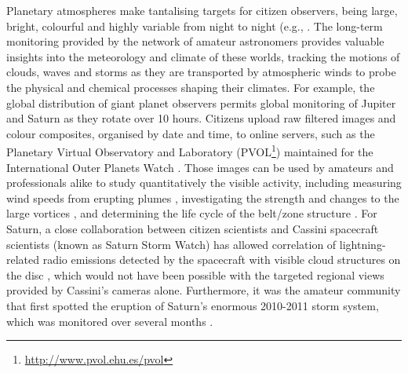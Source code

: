 \documentclass{ar2e}
\begin{document}

Planetary atmospheres make tantalising targets for citizen observers, being
large, bright, colourful and highly variable from night to night (e.g., 
.  The long-term monitoring provided by the network of amateur
astronomers provides valuable insights into the meteorology and climate of these
worlds, tracking the motions of clouds, waves and storms as they are transported
by atmospheric winds to probe the physical and chemical processes shaping their
climates.  For example, the global distribution of giant planet observers
permits global monitoring of Jupiter and Saturn as they rotate over 10 hours.
Citizens upload raw filtered images and colour composites, organised by date and
time, to online servers, such as the Planetary Virtual Observatory and
Laboratory (PVOL\footnote{\url{http://www.pvol.ehu.es/pvol}}) maintained for the
International Outer Planets Watch \citep[IOPW][]{10hueso}.  Those images can be
used by amateurs and professionals alike to study quantitatively the visible
activity, including  measuring wind speeds from erupting plumes
\citep{08sanchez}, investigating the strength and changes to the large vortices
\citep[e.g., the 2006 reddening of Jupiter's Oval BA,][]{06simon-miller}, and
determining the life cycle of the belt/zone structure \citep{96sanchez,
11fletcher_fade}.  For Saturn, a close collaboration between citizen scientists
and Cassini spacecraft scientists (known as Saturn Storm Watch) has allowed
correlation of lightning-related radio emissions detected by the spacecraft with
visible cloud structures on the disc \citep[e.g.,][]{11fischer}, which would not
have been possible with the targeted regional views provided by Cassini's
cameras alone. Furthermore, it was the amateur community that first spotted the
eruption of Saturn's enormous 2010-2011 storm system, which was monitored over
several months \citep{12sanchez}.
\end{document}
